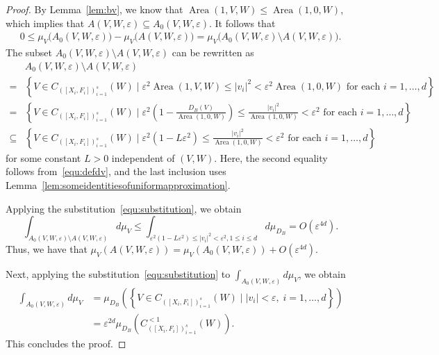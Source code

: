 \documentclass{compositio}
\numberwithin{equation}{section}
\numberwithin{figure}{section}
\theoremstyle{definition}
\theoremstyle{plain}
\begin{document}
{\begin{proof}
By Lemma~\ref{lem:bv}, we know that $\operatorname{Area}(1,V,W) \leq \operatorname{Area}(1,0,W)$, which implies that $A(V,W,\varepsilon) \subseteq A_0(V,W,\varepsilon)$.
It follows that
\begin{align*}
    0\leq \mu_V\big(A_0(V,W,\varepsilon)\big) - \mu_V\big(A(V,W,\varepsilon)\big) = \mu_V\big(A_0(V,W,\varepsilon)\setminus A(V,W,\varepsilon)\big).
\end{align*}
The subset $A_0(V,W,\varepsilon)\setminus A(V,W,\varepsilon)$ can be rewritten as
\begin{align*}
    & A_0(V,W,\varepsilon)\setminus A(V,W,\varepsilon) \\
    = & \left\{V \in C_{([X_i, F_i])_{i=1}^s}(W) \mid \varepsilon^2\operatorname{Area}(1, V, W) \leq |v_{i}|^2 < \varepsilon^2\operatorname{Area}(1, 0, W) \text{ for each } i=1,\dots,d \right\} \\
    = & \left\{V \in C_{([X_i, F_i])_{i=1}^s}(W) \mid \varepsilon^2\left(1 - \frac{D_B(V)}{\operatorname{Area}(1, 0, W)} \right) \leq \frac{|v_{i}|^2}{\operatorname{Area}(1, 0, W)} < \varepsilon^2 \text{ for each } i=1,\dots,d \right\} \\
    \subseteq & \left\{V \in C_{([X_i, F_i])_{i=1}^s}(W) \mid \varepsilon^2\left(1 - L\varepsilon^2 \right) \leq \frac{|v_{i}|^2}{\operatorname{Area}(1, 0, W)} < \varepsilon^2 \text{ for each } i=1,\dots,d \right\}
\end{align*}
for some constant $L>0$ independent of $(V,W)$. Here, the second equality follows from~\eqref{equ:defdv}, and the last inclusion uses Lemma~\ref{lem:someidentitiesofuniformapproximation}.

Applying the substitution~\eqref{equ:substitution}, we obtain
$$
\int_{A_0(V,W,\varepsilon)\setminus A(V,W,\varepsilon)} d\mu_V \leq \int_{\varepsilon^2\left(1 - L\varepsilon^2 \right) \leq |v_{i}|^2 < \varepsilon^2, 1\leq i\leq d} d\mu_{D_B} = O(\varepsilon^{4d}).
$$
Thus, we have that
$\mu_V(A(V,W,\varepsilon)) = \mu_V(A_0(V,W,\varepsilon)) + O(\varepsilon^{4d}).$

Next, applying the substitution~\eqref{equ:substitution} to $\int_{A_0(V,W,\varepsilon)} d\mu_V$, we obtain
\begin{align*}
    \int_{A_0(V,W,\varepsilon)} d\mu_V &= \mu_{D_B}\left(\left\{V\in C_{([X_i, F_i])_{i=1}^s}(W)\mid |v_i|<\varepsilon, \; i=1,\dots,d\right\}\right) \\
    &= \varepsilon^{2d} \mu_{D_B}\left(C^{< 1}_{([X_i, F_i])_{i=1}^s}(W)\right).
\end{align*}
This concludes the proof.
\end{proof}

}
\end{document}
